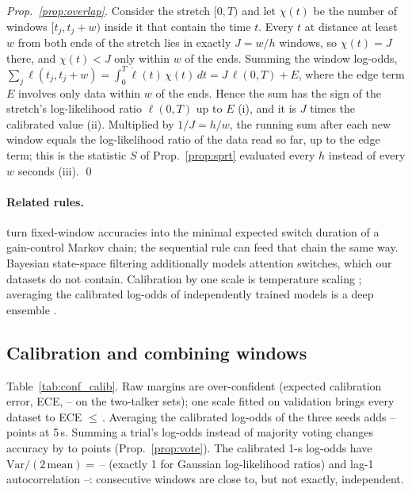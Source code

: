 \emph{Prop.~\ref{prop:overlap}.} Consider the stretch $[0,T)$ and let $\chi(t)$ be the number of
windows $[t_j,t_j+w)$ inside it that contain the time $t$. Every $t$ at distance at least $w$
from both ends of the stretch lies in exactly $J=w/h$ windows, so $\chi(t)=J$ there, and
$\chi(t)<J$ only within $w$ of the ends. Summing the window log-odds,
$\sum_j\ell(t_j,t_j+w)=\int_0^T\dot\ell(t)\,\chi(t)\,dt=J\,\ell(0,T)+E$, where the edge term $E$
involves only data within $w$ of the ends. Hence the sum has the sign of the stretch's
log-likelihood ratio $\ell(0,T)$ up to $E$ (i), and it is $J$ times the calibrated value (ii).
Multiplied by $1/J=h/w$, the running sum after each new window equals the log-likelihood ratio
of the data read so far, up to the edge term; this is the statistic $S$ of
Prop.~\ref{prop:sprt} evaluated every $h$ instead of every $w$ seconds (iii). \qed

\paragraph{Related rules.} \citet{geirnaert2020interpretable} turn fixed-window accuracies
into the minimal expected switch duration of a gain-control Markov chain; the sequential rule
can feed that chain the same way. Bayesian state-space filtering \citep{miran2018realtime}
additionally models attention switches, which our datasets do not contain. Calibration by one
scale is temperature scaling \citep{guo2017calibration}; averaging the calibrated log-odds of
independently trained models is a deep ensemble \citep{lakshminarayanan2017simple}.

\subsection{Calibration and combining windows}\label{app:conf:calib}
Table~\ref{tab:conf_calib}. Raw margins are over-confident (expected calibration error, ECE, \confEceRawMin--\confEceRawMax{}
on the two-talker sets); one scale fitted on validation brings every dataset to
ECE $\le$\,\confEceCalMax. Averaging the calibrated log-odds of the three seeds adds
\confEnsMin--\confEnsMax{} points at 5\,s. Summing a trial's log-odds instead of majority voting changes accuracy by
\confSumMin{} to \confSumMax{} points (Prop.~\ref{prop:vote}). The calibrated 1-s log-odds have
$\mathrm{Var}/(2\,\mathrm{mean})=$\,\confVarMin--\confVarMax{} (exactly 1 for Gaussian
log-likelihood ratios) and lag-1 autocorrelation \confLagMin--\confLagMax: consecutive windows
are close to, but not exactly, independent.
\begin{table}[h]\centering\small
\caption{Calibration and combination of windows (test folds; mean of 3 seeds unless marked).
ECE: expected calibration error, 10 bins; NLL: log-loss in bits (chance 1). ens.: average of
the 3 seeds' calibrated log-odds. Trial: one decision per trial by majority vote of the 5-s
windows or by the sign of their summed log-odds. Last two columns: diagnostics of
Prop.~\ref{prop:gauss} on the 1-s log-odds.}\label{tab:conf_calib}

\end{table}

